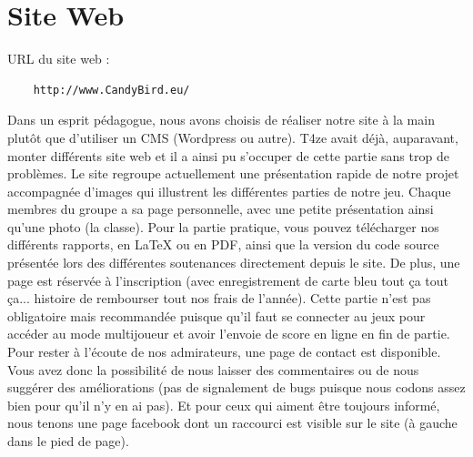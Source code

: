 \documentclass [11pt]{report}
\begin{document}
	 
	 
	\section{Site Web}
	
	URL du site web : 
	\begin{Verbatim}
	http://www.CandyBird.eu/
	\end{Verbatim}
	
	Dans un esprit pédagogue, nous avons choisis de réaliser notre site à la main plutôt que d'utiliser un CMS (Wordpress ou autre). T4ze avait déjà, auparavant, monter différents site web et il a ainsi pu s'occuper de cette partie sans trop de problèmes. Le site regroupe actuellement une présentation rapide de notre projet accompagnée d'images qui illustrent les différentes parties de notre jeu. Chaque membres du groupe a sa page personnelle, avec une petite présentation ainsi qu'une photo (la classe). Pour la partie pratique, vous pouvez télécharger nos différents rapports, en LaTeX ou en PDF, ainsi que la version du code source présentée lors des différentes soutenances directement depuis le site. De plus, une page est réservée à l'inscription (avec enregistrement de carte bleu tout ça tout ça... histoire de rembourser tout nos frais de l'année). Cette partie n'est pas obligatoire mais recommandée puisque qu'il faut se connecter au jeux pour accéder au mode multijoueur et avoir l'envoie de score en ligne en fin de partie.\\
	
	Pour rester à l'écoute de nos admirateurs, une page de contact est disponible. Vous avez donc la possibilité de nous laisser des commentaires ou de nous suggérer des améliorations (pas de signalement de bugs puisque nous codons assez bien pour qu'il n'y en ai pas). Et pour ceux qui aiment être toujours informé, nous tenons une page facebook dont un raccourci est visible sur le site (à gauche dans le pied de page).
	
	
\end{document}
